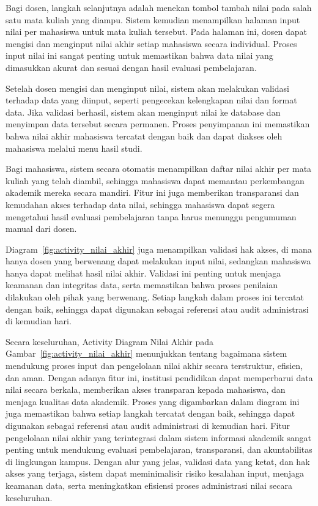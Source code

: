 \documentclass[a4paper,oneside,11pt]{book}
\begin{document}
Bagi dosen, langkah selanjutnya adalah menekan tombol tambah nilai pada salah satu mata kuliah yang diampu. Sistem kemudian menampilkan halaman input nilai per mahasiswa untuk mata kuliah tersebut. Pada halaman ini, dosen dapat mengisi dan menginput nilai akhir setiap mahasiswa secara individual. Proses input nilai ini sangat penting untuk memastikan bahwa data nilai yang dimasukkan akurat dan sesuai dengan hasil evaluasi pembelajaran.

Setelah dosen mengisi dan menginput nilai, sistem akan melakukan validasi terhadap data yang diinput, seperti pengecekan kelengkapan nilai dan format data. Jika validasi berhasil, sistem akan menginput nilai ke database dan menyimpan data tersebut secara permanen. Proses penyimpanan ini memastikan bahwa nilai akhir mahasiswa tercatat dengan baik dan dapat diakses oleh mahasiswa melalui menu hasil studi.

Bagi mahasiswa, sistem secara otomatis menampilkan daftar nilai akhir per mata kuliah yang telah diambil, sehingga mahasiswa dapat memantau perkembangan akademik mereka secara mandiri. Fitur ini juga memberikan transparansi dan kemudahan akses terhadap data nilai, sehingga mahasiswa dapat segera mengetahui hasil evaluasi pembelajaran tanpa harus menunggu pengumuman manual dari dosen.

Diagram~\ref{fig:activity_nilai_akhir} juga menampilkan validasi hak akses, di mana hanya dosen yang berwenang dapat melakukan input nilai, sedangkan mahasiswa hanya dapat melihat hasil nilai akhir. Validasi ini penting untuk menjaga keamanan dan integritas data, serta memastikan bahwa proses penilaian dilakukan oleh pihak yang berwenang. Setiap langkah dalam proses ini tercatat dengan baik, sehingga dapat digunakan sebagai referensi atau audit administrasi di kemudian hari.

Secara keseluruhan, Activity Diagram Nilai Akhir pada Gambar~\ref{fig:activity_nilai_akhir} menunjukkan tentang bagaimana sistem mendukung proses input dan pengelolaan nilai akhir secara terstruktur, efisien, dan aman. Dengan adanya fitur ini, institusi pendidikan dapat memperbarui data nilai secara berkala, memberikan akses transparan kepada mahasiswa, dan menjaga kualitas data akademik. Proses yang digambarkan dalam diagram ini juga memastikan bahwa setiap langkah tercatat dengan baik, sehingga dapat digunakan sebagai referensi atau audit administrasi di kemudian hari. Fitur pengelolaan nilai akhir yang terintegrasi dalam sistem informasi akademik sangat penting untuk mendukung evaluasi pembelajaran, transparansi, dan akuntabilitas di lingkungan kampus. Dengan alur yang jelas, validasi data yang ketat, dan hak akses yang terjaga, sistem dapat meminimalisir risiko kesalahan input, menjaga keamanan data, serta meningkatkan efisiensi proses administrasi nilai secara keseluruhan.
\end{document}
